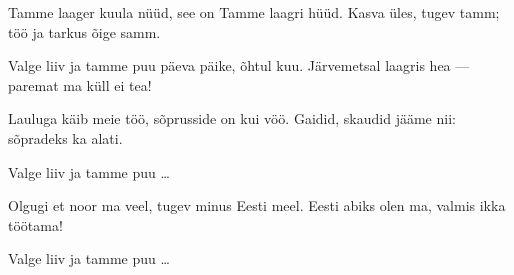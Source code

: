 Tamme laager kuula n\"u\"ud,
see on Tamme laagri h\"u\"ud.
Kasva \"ules, tugev tamm;
t\"o\"o ja tarkus \~oige samm.

Valge liiv ja tamme puu
p\"aeva p\"aike, \~ohtul kuu.
J\"arvemetsal laagris hea ---
paremat ma k\"ull ei tea!

Lauluga k\"aib meie t\"o\"o,
s\~oprusside on kui v\"o\"o.
Gaidid, skaudid j\"a\"ame nii:
s\~opradeks ka alati.

Valge liiv ja tamme puu \ldots

Olgugi et noor ma veel,
tugev minus Eesti meel.
Eesti abiks olen ma,
valmis ikka t\"o\"otama!

Valge liiv ja tamme puu \ldots